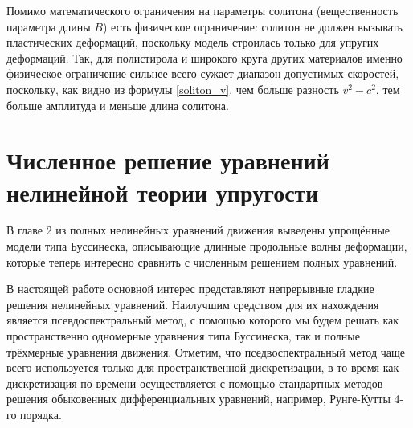 \documentclass[12pt, a4paper]{report}
\begin{document}
Помимо математического ограничения на параметры солитона (вещественность параметра длины $B$) есть физическое ограничение: солитон не должен вызывать пластических деформаций, поскольку модель строилась только для упругих деформаций. Так, для полистирола и широкого круга других материалов именно физическое ограничение сильнее всего сужает диапазон допустимых скоростей, поскольку, как видно из формулы \eqref{soliton_v}, чем больше разность ${v^2-c^2}$, тем больше амплитуда и меньше длина солитона.



\chapter{Численное решение уравнений нелинейной теории упругости}
В главе 2 из полных нелинейных уравнений движения 
выведены упрощённые модели типа Буссинеска, описывающие длинные продольные волны деформации, которые теперь интересно сравнить с численным решением полных уравнений.

В настоящей работе основной интерес представляют непрерывные гладкие решения нелинейных уравнений. Наилучшим средством для их нахождения является псевдоспектральный метод, с помощью которого мы будем решать как пространственно одномерные уравнения типа Буссинеска, так и полные трёхмерные уравнения движения.
Отметим, что пседвоспектральный метод чаще всего используется только для пространственной дискретизации, в то время как дискретизация по времени осуществляется с помощью стандартных методов решения обыковенных дифференциальных уравнений, например, Рунге-Кутты 4-го порядка.
\end{document}
